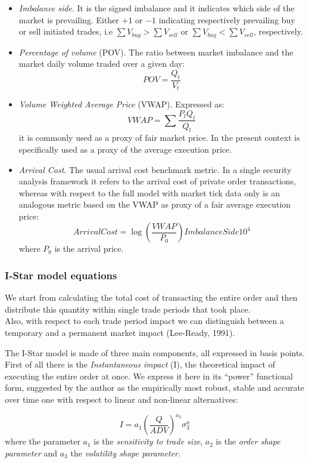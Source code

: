 \begin{itemize}
\item
  \emph{Imbalance side}. It is the signed imbalance and it indicates
  which side of the market is prevailing. Either \(+1\) or \(-1\)
  indicating respectively prevailing buy or sell initiated trades, i.e
  \(\sum{V_{buy}} > \sum{V_{sell}}\) or
  \(\sum{V_{buy}} < \sum{V_{sell}}\), respectively.
\item
  \emph{Percentage of volume} (POV). The ratio between market imbalance
  and the market daily volume traded over a given day:
  \[ POV = \frac{Q_{t}}{V_{t}}\]
\item
  \emph{Volume Weighted Average Price} (VWAP). Expressed as:
  \[ VWAP = \sum{\frac{P_{t}Q_{t}}{Q_{t}}} \] it is commonly used as a
  proxy of fair market price. In the present context is specifically
  used as a proxy of the average execution price.
\item
  \emph{Arrival Cost}. The usual arrival cost benchmark metric. In a
  single security analysis framework it refers to the arrival cost of
  private order transactions, whereas with respect to the full model
  with market tick data only is an analogous metric based on the VWAP as
  proxy of a fair average execution price:
  \[ Arrival Cost = \log(\frac{VWAP}{P_{0}}) Imbalance Side 10^{4} \]
  where \(P_{0}\) is the arrival price.
\end{itemize}

\hypertarget{i-star-model-equations}{%
\subsubsection{I-Star model equations}\label{i-star-model-equations}}

We start from calculating the total cost of transacting the entire order
and then distribute this quantity within single trade periods that took
place.\\
Also, with respect to each trade period impact we can distinguish
between a temporary and a permanent market impact (Lee-Ready, 1991).

The I-Star model is made of three main components, all expressed in
basis points. First of all there is the \emph{Instantaneous impact} (I),
the theoretical impact of executing the entire order at once. We express
it here in its ``power'' functional form, suggested by the author as the
empirically most robust, stable and accurate over time one with respect
to linear and non-linear alternatives:

\[ I = a_1 (\frac{Q}{ADV})^{a_2} \sigma^a_{3} \] where the parameter
\(a_1\) is the \emph{sensitivity to trade size}, \(a_2\) is the
\emph{order shape parameter} and \(a_3\) the
\emph{volatility shape parameter}.

